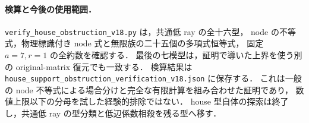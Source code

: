 \paragraph{検算と今後の使用範囲．}
\nolinkurl{verify_house_obstruction_v18.py} は，共通低 ray の全十六型，
node の不等式，物理標識付き node 式と無限族の二十五個の多項式恒等式，
固定 $a=7,r=1$ の全約数を確認する．
最後の七模型は，証明で導いた上界を使う別の original-matrix 復元でも一致する．
検算結果は \nolinkurl{house_support_obstruction_verification_v18.json} に保存する．
これは一般の node 不等式による場合分けと完全な有限計算を組み合わせた証明であり，
数値上限以下の分母を試した経験的排除ではない．
house 型自体の探索は終了し，共通低 ray の型分類と低辺係数相殺を残る型へ移す．

